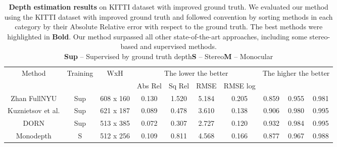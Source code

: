\documentclass[journal]{IEEEtran}
\begin{document}
\begin{table*}
\centering
\caption{\textbf{Depth estimation results} on KITTI dataset with improved ground truth\cite{uhrig2017sparsity}. We evaluated our method using the KITTI dataset with improved ground truth and followed convention by sorting methods in each category by their Absolute Relative error with respect to the ground truth. The best methods were highlighted in \textbf{Bold}. Our method surpassed all other state-of-the-art approaches, including some stereo-based and supervised methods. \\
\textbf{Sup} – Supervised by ground truth depth\quad \textbf{S} – Stereo\quad \textbf{M} – Monocular}
\label{tab:4}
\begin{tabular}{cccccccccc}
\toprule[1pt]
\multirow{2}{*}{Method}    & \multirow{2}{*}{Training} & \multirow{2}{*}{WxH} & \multicolumn{4}{c}{The lower the better}                                                          & \multicolumn{3}{c}{The higher the better}                                                        \\ \cline{4-10} 
                           &                           &                      & \multicolumn{1}{c}{Abs Rel} & \multicolumn{1}{c}{Sq Rel} & \multicolumn{1}{c}{RMSE}  & RMSE log & \multicolumn{1}{c}{} & \multicolumn{1}{c}{} &  \\ \hline
Zhan FullNYU \cite{zhan2018unsupervised}        & Sup                       & 608 x 160            & \multicolumn{1}{c}{0.130}   & \multicolumn{1}{c}{1.520}  & \multicolumn{1}{c}{5.184} & 0.205    & \multicolumn{1}{c}{0.859}           & \multicolumn{1}{c}{0.955}             & 0.981             \\
Kuznietsov et al. \cite{kuznietsov2017semi} & Sup                       & 621 x 187            & \multicolumn{1}{c}{0.089}   & \multicolumn{1}{c}{0.478}  & \multicolumn{1}{c}{3.610} & 0.138    & \multicolumn{1}{c}{0.906}           & \multicolumn{1}{c}{0.980}             & 0.995             \\
DORN \cite{fu2018deep}               & Sup                       & 513 x 385            & \multicolumn{1}{c}{0.072}   & \multicolumn{1}{c}{0.307}  & \multicolumn{1}{c}{2.727} & 0.120    & \multicolumn{1}{c}{0.932}           & \multicolumn{1}{c}{0.984}             & 0.995             \\ \hline
Monodepth \cite{godard2017unsupervised}          & S                         & 512 x 256            & \multicolumn{1}{c}{0.109}   & \multicolumn{1}{c}{0.811}  & \multicolumn{1}{c}{4.568} & 0.166    & \multicolumn{1}{c}{0.877}           & \multicolumn{1}{c}{0.967}             & 0.988             \\

\end{tabular}
\end{table*}
\end{document}
